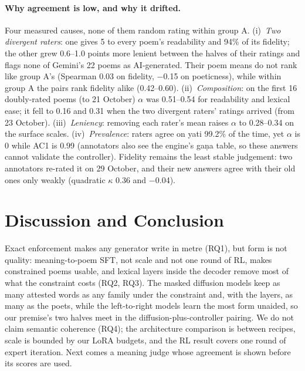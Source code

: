 \documentclass[11pt]{article}
\begin{document}
\paragraph{Why agreement is low, and why it drifted.} Four measured causes, none of them random rating within
group A. (i)~\emph{Two divergent raters}: one gives 5 to every poem's readability and 94\% of its fidelity; the
other grew 0.6--1.0 points more lenient between the halves of their ratings and flags none of Gemini's 22 poems
as AI-generated. Their poem means do not rank like group A's (Spearman 0.03 on fidelity, $-$0.15 on poeticness),
while within group A the pairs rank fidelity alike (0.42--0.60). (ii)~\emph{Composition}: on the first 16
doubly-rated poems (to 21 October) $\alpha$ was 0.51--0.54 for readability and lexical ease; it fell to 0.16 and
0.31 when the two divergent raters' ratings arrived (from 23 October). (iii)~\emph{Leniency}: removing
each rater's mean raises $\alpha$ to 0.28--0.34 on the surface scales. (iv)~\emph{Prevalence}: raters
agree on yati 99.2\% of the time, yet $\alpha$ is 0 while AC1 is 0.99 \citep{feinstein1990paradox,gwet2008ac1}
(annotators also see the engine's gaṇa table, so these answers cannot validate the controller). Fidelity remains
the least stable judgement: two annotators re-rated it on 29 October, and their new answers agree with their old
ones only weakly (quadratic $\kappa$ 0.36 and $-$0.04).

\section{Discussion and Conclusion}\label{sec:discussion}

Exact enforcement makes any generator write in metre (RQ1), but form is not quality: meaning-to-poem SFT, not
scale and not one round of RL, makes constrained poems usable, and lexical layers inside the decoder remove most of
what the constraint costs (RQ2, RQ3). The masked diffusion models keep as many attested words as any family under
the constraint and, with the layers, as many as the poets, while the left-to-right models learn the most form
unaided, so our premise's two halves meet in the diffusion-plus-controller pairing. We do not claim semantic
coherence (RQ4); the architecture comparison is between recipes, scale is bounded by our LoRA budgets, and the
RL result covers one round of expert iteration. Next comes a meaning judge whose agreement is shown before its
scores are used.
\end{document}
